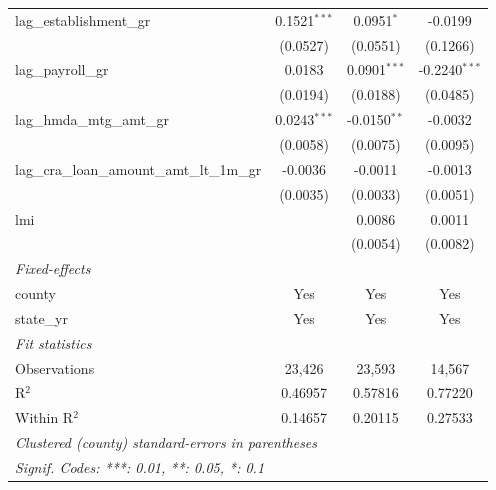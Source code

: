 \begin{tabular}{lccc}
   lag\_establishment\_gr                         & 0.1521$^{***}$          & 0.0951$^{*}$    & -0.0199\\   
                                                  & (0.0527)                & (0.0551)        & (0.1266)\\   
   lag\_payroll\_gr                               & 0.0183                  & 0.0901$^{***}$  & -0.2240$^{***}$\\   
                                                  & (0.0194)                & (0.0188)        & (0.0485)\\   
   lag\_hmda\_mtg\_amt\_gr                        & 0.0243$^{***}$          & -0.0150$^{**}$  & -0.0032\\   
                                                  & (0.0058)                & (0.0075)        & (0.0095)\\   
   lag\_cra\_loan\_amount\_amt\_lt\_1m\_gr        & -0.0036                 & -0.0011         & -0.0013\\   
                                                  & (0.0035)                & (0.0033)        & (0.0051)\\   
   lmi                                            &                         & 0.0086          & 0.0011\\   
                                                  &                         & (0.0054)        & (0.0082)\\   
   \midrule
   \emph{Fixed-effects}\\
   county                                         & Yes                     & Yes             & Yes\\  
   state\_yr                                      & Yes                     & Yes             & Yes\\  
   \midrule
   \emph{Fit statistics}\\
   Observations                                   & 23,426                  & 23,593          & 14,567\\  
   R$^2$                                          & 0.46957                 & 0.57816         & 0.77220\\  
   Within R$^2$                                   & 0.14657                 & 0.20115         & 0.27533\\  
   \midrule \midrule
   \multicolumn{4}{l}{\emph{Clustered (county) standard-errors in parentheses}}\\
   \multicolumn{4}{l}{\emph{Signif. Codes: ***: 0.01, **: 0.05, *: 0.1}}\\
\end{tabular}
\par\endgroup
